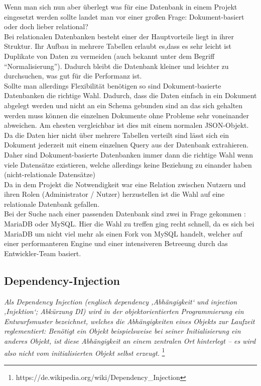 Wenn man sich nun aber überlegt was für eine Datenbank in einem Projekt eingesetzt werden sollte landet man vor einer großen Frage: Dokument-basiert oder doch lieber relational? \\
Bei relationalen Datenbanken besteht einer der Hauptvorteile liegt in ihrer Struktur. Ihr Aufbau in mehrere Tabellen erlaubt es,dass es sehr leicht ist Duplikate von Daten zu vermeiden (auch bekannt unter dem Begriff ``Normalisierung''). Dadurch bleibt die Datenbank kleiner und leichter zu durchsuchen, was gut für die Performanz ist. \\

Sollte man allerdings Flexibilität benötigen so sind Dokument-basierte Datenbanken die richtige Wahl. Dadurch, dass die Daten einfach in ein Dokument abgelegt werden und nicht an ein Schema gebunden sind an das sich gehalten werden muss können die einzelnen Dokumente ohne Probleme sehr voneinander abweichen. Am ehesten vergleichbar ist dies mit einem normalen JSON-Objekt. Da die Daten hier nicht über mehrere Tabellen verteilt sind lässt sich ein Dokument jederzeit mit einem einzelnen Query aus der Datenbank extrahieren. Daher sind Dokument-basierte Datenbanken immer dann die richtige Wahl wenn viele Datensätze existieren, welche allerdings keine Beziehung zu einander haben (nicht-relationale Datensätze) \\

Da in dem Projekt die Notwendigkeit war eine Relation zwischen Nutzern und ihren Rolen (Administrator / Nutzer) herzustellen ist die Wahl auf eine relationale Datenbank gefallen. \\

Bei der Suche nach einer passenden Datenbank sind zwei in Frage gekommen : MariaDB oder MySQL. Hier die Wahl zu treffen ging recht schnell, da es sich bei MariaDB um nicht viel mehr als einen Fork von MySQL handelt, welcher auf einer performanteren Engine und einer intensiveren Betreeung durch das Entwickler-Team basiert.



\subsection{Dependency-Injection}

\emph{\glqq   
Als Dependency Injection (englisch dependency ‚Abhängigkeit‘ und injection ‚Injektion‘; Abkürzung DI) wird in der objektorientierten Programmierung ein Entwurfsmuster bezeichnet, welches die Abhängigkeiten eines Objekts zur Laufzeit reglementiert: Benötigt ein Objekt beispielsweise bei seiner Initialisierung ein anderes Objekt, ist diese Abhängigkeit an einem zentralen Ort hinterlegt – es wird also nicht vom initialisierten Objekt selbst erzeugt. \grqq} \footnote{https://de.wikipedia.org/wiki/Dependency\_Injection} \\ 

